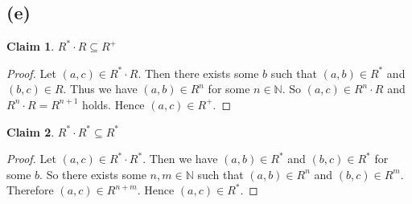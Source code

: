 \documentclass[autodetect-enginem]{article}
\theoremstyle{plain}
\theoremstyle{definition}
\theoremstyle{definition}
\newtheorem*{claim}{Claim}
\begin{document}

\newcommand{\RS}{R^{*}}
\newcommand{\RP}{R^{+}}
\newcommand{\RN}{R^{n}}
\newcommand{\NN}{\mathbb{N}}

\subsection*{(e)}
\begin{claim}
    $\RS \cdot R \subseteq \RP$
\end{claim}

\begin{proof}
    Let $(a,c) \in \RS \cdot R$.
    Then there exists some $b$ such that
    $(a,b) \in \RS$ and $(b,c) \in R$.
    Thus we have $(a,b) \in \RN$ for some $n \in \NN$.
    So $(a,c) \in \RN \cdot R$ and $\RN \cdot R = R^{n+1}$ holds.
    Hence $(a,c) \in \RP$.
\end{proof}

\begin{claim}
    $\RS \cdot \RS \subseteq \RS$
\end{claim}

\newcommand{\RM}{R^{m}}

\begin{proof}
    Let $(a,c) \in \RS \cdot \RS$.
    Then we have $(a,b) \in \RS$ and $(b,c) \in \RS$ for some $b$.
    So there exists some $n,m \in \NN$ such that $(a,b) \in \RN$ and $(b,c) \in \RM$.
    Therefore $(a,c) \in R^{n+m}$.
    Hence $(a,c) \in \RS$.
\end{proof}
\end{document}
